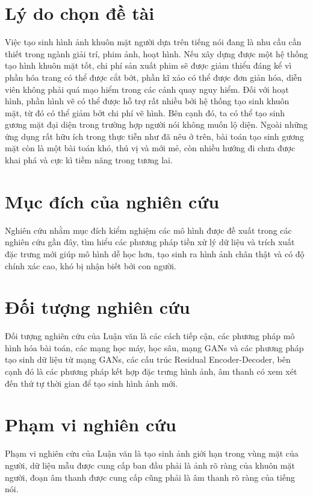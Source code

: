 \section{\texorpdfstring{Lý do chọn đề tài}{Why}}
Việc tạo sinh hình ảnh khuôn mặt người dựa trên tiếng nói đang là nhu cầu cần thiết trong ngành giải trí, phim ảnh, hoạt hình. Nếu xây dựng được một hệ thống tạo hình khuôn mặt tốt, chi phí sản xuất phim sẽ được giảm thiểu đáng kể vì phần hóa trang có thể được cắt bớt, phần kĩ xảo có thể được đơn giản hóa, diễn viên không phải quá mạo hiểm trong các cảnh quay nguy hiểm. Đối với hoạt hình, phần hình vẽ có thể được hỗ trợ rất nhiều bởi hệ thống tạo sinh khuôn mặt, từ đó có thể giảm bớt chi phí vẽ hình. Bên cạnh đó, ta có thể tạo sinh gương mặt đại diện trong trường hợp người nói không muốn lộ diện. Ngoài những ứng dụng rất hữu ích trong thực tiễn như đã nêu ở trên, bài toán tạo sinh gương mặt còn là một bài toán khó, thú vị và mới mẻ, còn nhiều hướng đi chưa được khai phá và cực kì tiềm năng trong tương lai.

\section{\texorpdfstring{Mục đích của nghiên cứu}{Target}}
Nghiên cứu nhằm mục đích kiểm nghiệm các mô hình được đề xuất trong các nghiên cứu gần đây, tìm hiểu các phương pháp tiền xử lý dữ liệu và trích xuất đặc trưng mới giúp mô hình dễ học hơn, tạo sinh ra hình ảnh chân thật và có độ chính xác cao, khó bị nhận biết bởi con người.

\section{\texorpdfstring{Đối tượng nghiên cứu}{Objective}}
Đối tượng nghiên cứu của Luận văn là các cách tiếp cận, các phương pháp mô hình hóa bài toán, các mạng học máy, học sâu, mạng GANs và các phương pháp tạo sinh dữ liệu từ mạng GANs, các cấu trúc Residual Encoder-Decoder, bên cạnh đó là các phương pháp kết hợp đặc trưng hình ảnh, âm thanh có xem xét đến thứ tự thời gian để tạo sinh hình ảnh mới.

\section{\texorpdfstring{Phạm vi nghiên cứu}{Research}}
Phạm vi nghiên cứu của Luận văn là tạo sinh ảnh giới hạn trong vùng mặt của người, dữ liệu mẫu được cung cấp ban đầu phải là ảnh rõ ràng của khuôn mặt người, đoạn âm thanh được cung cấp cũng phải là âm thanh rõ ràng của tiếng nói.

